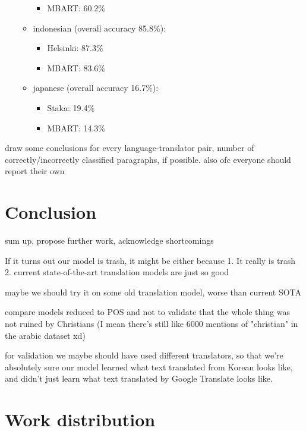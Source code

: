 \documentclass[twocolumn]{article}
\begin{document}
\begin{itemize}
\begin{itemize}
\begin{itemize}
			\item MBART: 60.2\%
		\end{itemize}
		\item{indonesian} (overall accuracy 85.8\%): 
		\begin{itemize}
			\item Helsinki: 87.3\%
			\item MBART: 83.6\%
		\end{itemize}
		\item{japanese} (overall accuracy 16.7\%): 
		\begin{itemize}
			\item Staka: 19.4\%
			\item MBART: 14.3\%
		\end{itemize}


		\end{itemize}
\end{itemize}

draw some conclusions
for every language-translator pair, number of correctly/incorrectly classified paragraphs, if possible. also ofc everyone should report their own


\section*{Conclusion}

sum up, propose further work, acknowledge shortcomings

If it turns out our model is trash, it might be either because 1. It really is trash 2. current state-of-the-art translation models are just so good

maybe we should try it on some old translation model, worse than current SOTA

compare models reduced to POS and not to validate that the whole thing was not ruined by Christians (I mean there's still like 6000 mentions of "christian" in the arabic dataset xd)

for validation we maybe should have used different translators, so that we're absolutely sure our model learned what text translated from Korean looks like, and didn't just learn what text translated by Google Translate looks like.



\section*{Work distribution}
\end{document}
